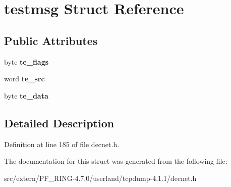 \hypertarget{structtestmsg}{
\section{testmsg Struct Reference}
\label{structtestmsg}
}
\subsection*{Public Attributes}
\begin{DoxyCompactItemize}
\item 
\hypertarget{structtestmsg_a6d5a64da63903a40c918a95b6db7a8ec}{
byte {\bfseries te\_\-flags}}
\label{structtestmsg_a6d5a64da63903a40c918a95b6db7a8ec}

\item 
\hypertarget{structtestmsg_aec81d8337a43b9e21e80f10f32c7f520}{
word {\bfseries te\_\-src}}
\label{structtestmsg_aec81d8337a43b9e21e80f10f32c7f520}

\item 
\hypertarget{structtestmsg_a56814d843329f6ea17646df7f18d3066}{
byte {\bfseries te\_\-data}}
\label{structtestmsg_a56814d843329f6ea17646df7f18d3066}

\end{DoxyCompactItemize}


\subsection{Detailed Description}


Definition at line 185 of file decnet.h.



The documentation for this struct was generated from the following file:\begin{DoxyCompactItemize}
\item 
src/extern/PF\_\-RING-\/4.7.0/userland/tcpdump-\/4.1.1/decnet.h\end{DoxyCompactItemize}
